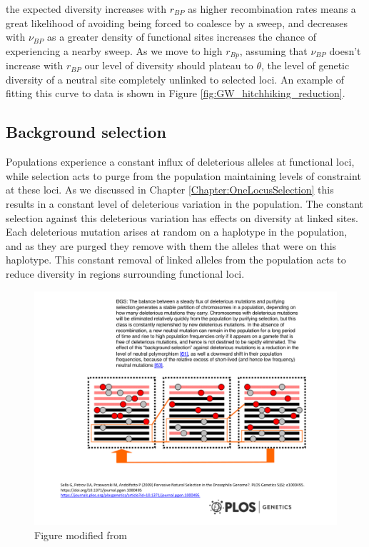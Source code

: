 the expected diversity increases with $r_{BP}$ as higher recombination rates means a great likelihood of avoiding being forced to coalesce by a sweep, and decreases with $\nu_{BP}$ as a greater density of functional sites increases the chance of experiencing a nearby sweep. As we move to high $r_{Bp}$, assuming that $\nu_{BP}$ doesn't increase with $r_{BP}$ our level of diversity should plateau to $\theta$, the level of genetic diversity of a neutral site completely unlinked to selected loci. An example of fitting this curve to data is shown in Figure \ref{fig:GW_hitchhiking_reduction}. 

\subsection{Background selection}

Populations experience a constant influx of
deleterious alleles at functional loci, while selection acts to purge
from the population maintaining levels of constraint at these loci. As
we discussed in Chapter \ref{Chapter:OneLocusSelection} this results
in a constant level of deleterious variation in the population. The
constant selection against this deleterious variation has effects on diversity at linked
sites. Each deleterious mutation arises at random on a haplotype in the
population, and as they are purged they remove with them the alleles that were on this
haplotype. This constant removal of linked alleles from the population
acts to reduce diversity in regions surrounding functional loci. 

\begin{figure}
\begin{center}
\includegraphics[width=0.75 \textwidth]{figures/Hitchhiking/BGS_cartoon.pdf}
\end{center}
\caption{Figure modified from \citet{sella2009pervasive}} \label{fig:BGS_cartoon}
\end{figure}



